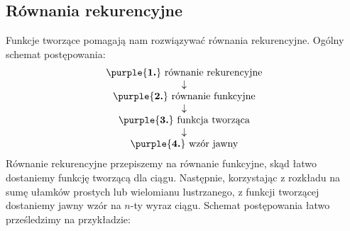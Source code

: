 \subsection{Równania rekurencyjne}

Funkcje tworzące pomagają nam rozwiązywać równania rekurencyjne. Ogólny schemat postępowania:
$$
\begin{matrix}
    \text{\purple{\textbf{1.}} równanie rekurencyjne} \\
    \downarrow \\
    \text{\purple{\textbf{2.}} równanie funkcyjne} \\
    \downarrow \\
    \text{\purple{\textbf{3.}} funkcja tworząca} \\
    \downarrow \\
    \text{\purple{\textbf{4.}} wzór jawny}
\end{matrix}
$$
Równanie rekurencyjne przepiszemy na równanie funkcyjne, skąd łatwo dostaniemy funkcję tworzącą dla ciągu. Następnie, korzystając z rozkładu na sumę ułamków prostych lub wielomianu lustrzanego, z funkcji tworzącej dostaniemy jawny wzór na $n$-ty wyraz ciągu. Schemat postępowania łatwo prześledzimy na przykładzie:
